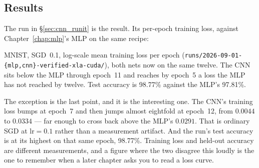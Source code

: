 \subsection*{Results}

The run in \S\ref{sec:cnn_runit} is the result. Its per-epoch training
loss, against Chapter~\ref{chap:mlp}'s MLP on the same recipe:

\begin{center}
\end{center}

\noindent MNIST, SGD~0.1, log-scale mean training loss per epoch
(\texttt{runs/2026-09-01-\{mlp,cnn\}-verified-xla-cuda/}), both nets now on
the same twelve. The CNN sits below the MLP through epoch~11 and reaches
by epoch~5 a loss the MLP has not reached by twelve. Test accuracy is
98.77\% against the MLP's 97.81\%.

\medskip\noindent The exception is the last point, and it is the
interesting one. The CNN's training loss bumps at epoch~7 and then jumps
almost eightfold at epoch~12, from $0.0044$ to $0.0334$ --- far enough to
cross back above the MLP's $0.0291$. That is ordinary SGD at
$\text{lr}=0.1$ rather than a measurement artifact. And the run's test
accuracy is at its highest on that same epoch, 98.77\%. Training
loss and held-out accuracy are different measurements, and a figure where
the two disagree this loudly is the one to remember when a later chapter
asks you to read a loss curve.

